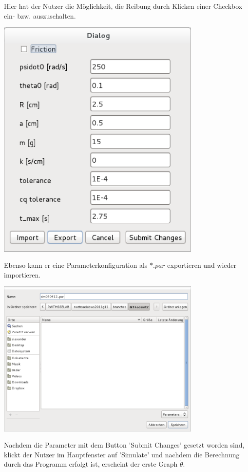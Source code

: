 Hier hat der Nutzer die M\"oglichkeit, die Reibung durch Klicken einer Checkbox ein- bzw. auszuschalten.

\includegraphics[width=4in,keepaspectratio=true]{figures/parameterwindow_nofriction.png}
\newpage

Ebenso kann er eine Parameterkonfiguration als $*.par$ exportieren und wieder importieren.

\includegraphics[width=4in,keepaspectratio=true]{figures/export_par.png} 
\newpage

Nachdem die Parameter mit dem Button 'Submit Changes' gesetzt worden sind, klickt der Nutzer im Hauptfenster auf 'Simulate' und nachdem die Berechnung durch das Programm erfolgt ist, erscheint der erste Graph $\dot \theta$.

